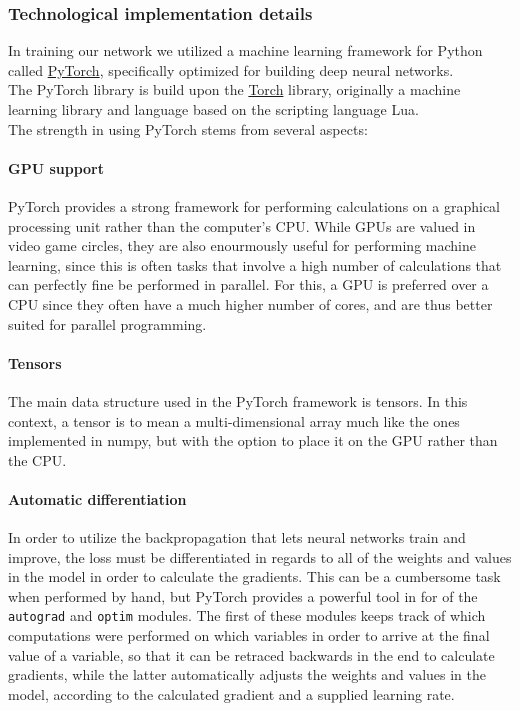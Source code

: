 \subsubsection{Technological implementation details}
In training our network we utilized a machine learning framework for Python called \href{https://pytorch.org/}{PyTorch}, specifically optimized for building deep neural networks. \\
The PyTorch library is build upon the \href{http://torch.ch/}{Torch} library, originally a machine learning library and language based on the scripting language Lua.\\
The strength in using PyTorch stems from several aspects:
\paragraph{GPU support}
PyTorch provides a strong framework for performing calculations on a graphical processing unit rather than the computer's CPU. While GPUs are valued in video game circles, they are also enourmously useful for performing machine learning, since this is often tasks that involve a high number of calculations that can perfectly fine be performed in parallel. For this, a GPU is preferred over a CPU since they often have a much higher number of cores, and are thus better suited for parallel programming.
\paragraph{Tensors}
The main data structure used in the PyTorch framework is tensors. In this context, a tensor is to mean a multi-dimensional array much like the ones implemented in numpy, but with the option to place it on the GPU rather than the CPU.
\paragraph{Automatic differentiation}
In order to utilize the backpropagation that lets neural networks train and improve, the loss must be differentiated in regards to all of the weights and values in the model in order to calculate the gradients. This can be a cumbersome task when performed by hand, but PyTorch provides a powerful tool in for of the \texttt{autograd} and \texttt{optim} modules. The first of these modules keeps track of which computations were performed on which variables in order to arrive at the final value of a variable, so that it can be retraced backwards in the end to calculate gradients, while the latter automatically adjusts the weights and values in the model, according to the calculated gradient and a supplied learning rate.

